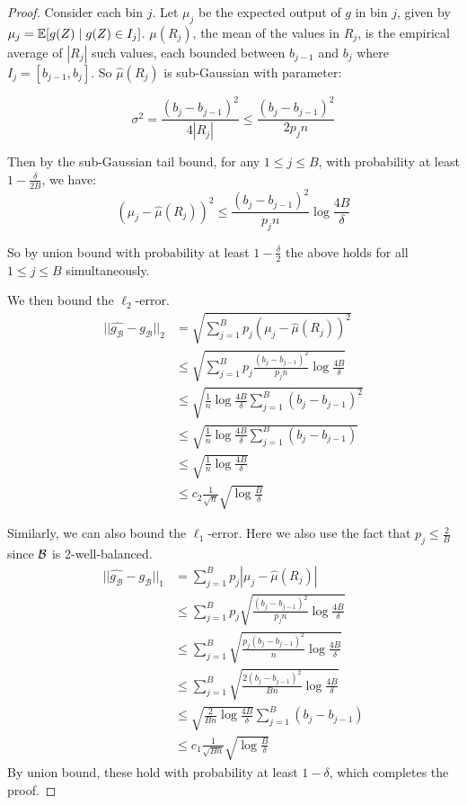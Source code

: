 \begin{proof}
Consider each bin $j$. Let $\mu_j$ be the expected output of $g$ in bin $j$, given by $\mu_j = \mathbb{E}[g(Z) \; | \; g(Z) \in I_j]$. $\mu(R_j)$, the mean of the values in $R_j$, is the empirical average of $|R_j|$ such values, each bounded between $b_{j-1}$ and $b_j$ where $I_j = [b_{j-1}, b_j]$. So $\hat{\mu}(R_j)$ is sub-Gaussian with parameter:

\[ \sigma^2 = \frac{(b_j - b_{j-1})^2}{4|R_j|} \leq \frac{(b_j - b_{j-1})^2}{2p_jn} \]

Then by the sub-Gaussian tail bound, for any $1 \leq j \leq B$, with probability at least $1 - \frac{\delta}{2B}$, we have:
\[ (\mu_j - \hat{\mu}(R_j))^2 \leq \frac{(b_j - b_{j-1})^2}{p_jn} \log{\frac{4B}{\delta}} \] 

So by union bound with probability at least $1 - \frac{\delta}{2}$ the above holds for all $1 \leq j \leq B$ simultaneously.

We then bound the $\ell_2$-error.
\begin{align*}
||\hat{g_{\mathcal{B}}} - g_{\mathcal{B}}||_2 &= \sqrt{\sum_{j =1}^B p_j (\mu_j - \hat{\mu}(R_j))^2} \\
&\leq \sqrt{\sum_{j =1}^B p_j \frac{(b_j - b_{j-1})^2}{p_jn} \log{\frac{4B}{\delta}}} \\
&\leq \sqrt{\frac{1}{n} \log{\frac{4B}{\delta}} \sum_{j =1}^B (b_j - b_{j-1})^2 } \\
&\leq \sqrt{\frac{1}{n} \log{\frac{4B}{\delta}} \sum_{j =1}^B (b_j - b_{j-1}) } \\
&\leq \sqrt{\frac{1}{n} \log{\frac{4B}{\delta}} } \\
&\leq c_2 \frac{1}{\sqrt{n}} \sqrt{\log{\frac{B}{\delta}}}
\end{align*}

Similarly, we can also bound the $\ell_1$-error. Here we also use the fact that $p_j \leq \frac{2}{B}$ since $\mathcal{B}{}$ is 2-well-balanced.
\begin{align*}
||\hat{g_{\mathcal{B}}} - g_{\mathcal{B}}||_1 &= \sum_{j =1}^B p_j |\mu_j - \hat{\mu}(R_j)| \\
&\leq \sum_{j =1}^B p_j \sqrt{\frac{(b_j - b_{j-1})^2}{p_jn} \log{\frac{4B}{\delta}}} \\
&\leq \sum_{j =1}^B \sqrt{\frac{p_j(b_j - b_{j-1})^2}{n} \log{\frac{4B}{\delta}}} \\
&\leq \sum_{j =1}^B \sqrt{\frac{2(b_j - b_{j-1})^2}{Bn} \log{\frac{4B}{\delta}}} \\
&\leq \sqrt{\frac{2}{Bn} \log{\frac{4B}{\delta}}} \sum_{j =1}^B (b_j - b_{j-1}) \\
&\leq c_1 \frac{1}{\sqrt{Bn}} \sqrt{\log{\frac{B}{\delta}}}
\end{align*}
By union bound, these hold with probability at least $1 - \delta$, which completes the proof.
\end{proof}

